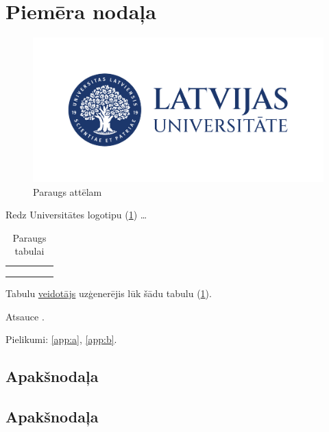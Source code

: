 \section{Piemēra nodaļa}

\blindtext

\begin{figure}[h]
    \centering
    \includegraphics[scale=0.1]{images/LU_logotips_LAT_horiz.jpg}
    \caption{Paraugs attēlam}
    \label{fig:lu}
\end{figure}

Redz Universitātes logotipu (\ref{fig:lu}) \dots

\begin{table}[h]
    \centering
    \caption{Paraugs tabulai}
    \begin{tabular}{|l|l|l|l|l|}
        \hline
         &  &  &  & \\ \hline
         &  &  &  & \\ \hline
         &  &  &  & \\ \hline
         &  &  &  & \\ \hline
    \end{tabular}
    \label{tbl:ex}
\end{table}

Tabulu \href{https://www.tablesgenerator.com/}{veidotājs} uzģenerējis lūk šādu tabulu (\ref{tbl:ex}).

Atsauce \cite{knuthwebsite,knuth-fa}.

Pielikumi: \ref{app:a}, \ref{app:b}.

\subsection{Apakšnodaļa}

\blindtext

\subsection{Apakšnodaļa}

\blindtext

\Blinddocument
